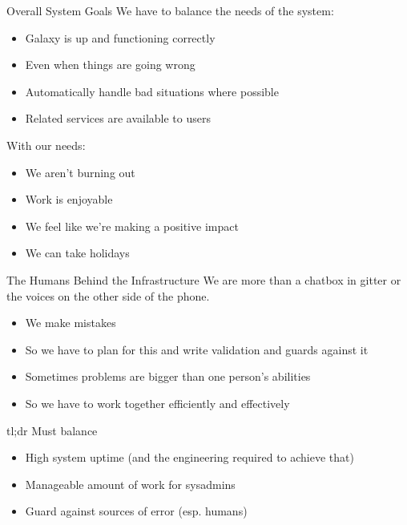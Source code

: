 \documentclass[12pt]{ufrslides}
\begin{document}
\begin{frame}{Overall System Goals}
	We have to balance the needs of the system:
	\vfill
	\begin{itemize}
		\item Galaxy is up and functioning correctly
		\item Even when things are going wrong
		\item Automatically handle bad situations where possible
		\item Related services are available to users
	\end{itemize}
	\vfill
	\pause
	With our needs:
	\vfill
	\begin{itemize}
		\item We aren't burning out
		\item Work is enjoyable
		\item We feel like we're making a positive impact
		\item We can take holidays
	\end{itemize}
\end{frame}

\begin{frame}{The Humans Behind the Infrastructure}
	We are more than a chatbox in gitter or the voices on the other side of the
	phone.
	\vfill
	\begin{itemize}
		\item We make mistakes
		\item So we have to plan for this and write validation and guards against it
		\item Sometimes problems are bigger than one person's abilities
		\item So we have to work together efficiently and effectively
	\end{itemize}
\end{frame}

\begin{frame}{tl;dr}
	Must balance
	\begin{itemize}
		\item High system uptime (and the engineering required to achieve that)
		\item Manageable amount of work for sysadmins
		\item Guard against sources of error (esp. humans)
	\end{itemize}
\end{frame}
\end{document}
